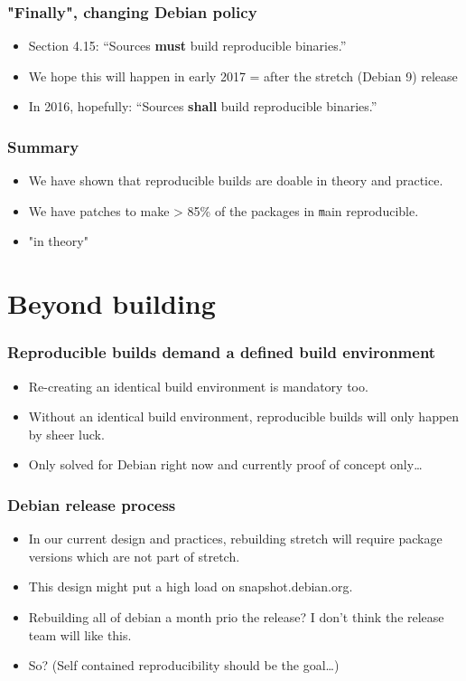 \documentclass[14pt]{beamer}
\begin{document}
\begin{frame}
 \frametitle{"Finally", changing Debian policy}

 \begin{itemize}
  \item Section 4.15: “Sources \textbf{must} build reproducible binaries.”
  \item<2-3> We hope this will happen in early 2017 = after the stretch
  (Debian 9) release
  \item<3> In 2016, hopefully: “Sources \textbf{shall} build reproducible binaries.”
 \end{itemize}
\end{frame}

\begin{frame}
 \frametitle{Summary}

 \begin{itemize}
  \item We have shown that reproducible builds are doable in theory and
  practice.
  \item We have patches to make > 85\% of the packages in
  \texttt main reproducible.
  \item<2> "in theory"
 \end{itemize}
\end{frame}


\section{Beyond building}


\begin{frame}
 \frametitle{Reproducible builds demand a defined build environment}
 \begin{itemize}
  \item Re-creating an identical build environment is mandatory too.
  \item Without an identical build environment, reproducible builds will only
  happen by sheer luck.
  \item<2>{Only solved for Debian right now and currently proof of concept only…}
 \end{itemize}
\end{frame}

\begin{frame}
 \frametitle{Debian release process}
 \begin{itemize}
  \item In our current design and practices, rebuilding stretch will require
  package versions which are not part of stretch.
  \item This design might put a high load on snapshot.debian.org.
  \item<2-3>{Rebuilding all of debian a month prio the release? I don't think
  the release team will like this. }
  \item<3>{So? (Self contained reproducibility should be the goal…)}
 \end{itemize}
\end{frame}
\end{document}
